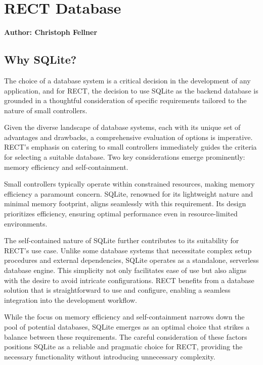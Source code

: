 \section{RECT Database}
\textbf{Author: Christoph Fellner}

\subsection{Why SQLite?}
The choice of a database system is a critical decision in the development of any application, and for RECT, the decision to use SQLite as the backend database 
is grounded in a thoughtful consideration of specific requirements tailored to the nature of small controllers.\newline

Given the diverse landscape of database systems, each with its unique set of advantages and drawbacks, a comprehensive evaluation of options is imperative. 
RECT's emphasis on catering to small controllers immediately guides the criteria for selecting a suitable database. Two key considerations emerge prominently: 
memory efficiency and self-containment.\newline

Small controllers typically operate within constrained resources, making memory efficiency a paramount concern. SQLite, renowned for its lightweight nature and 
minimal memory footprint, aligns seamlessly with this requirement. Its design prioritizes efficiency, ensuring optimal performance even in resource-limited 
environments.\newline

The self-contained nature of SQLite further contributes to its suitability for RECT's use case. Unlike some database systems that necessitate complex setup 
procedures and external dependencies, SQLite operates as a standalone, serverless database engine. This simplicity not only facilitates ease of use but also 
aligns with the desire to avoid intricate configurations. RECT benefits from a database solution that is straightforward to use and configure, enabling a 
seamless integration into the development workflow.\newline

While the focus on memory efficiency and self-containment narrows down the pool of potential databases, SQLite emerges as an optimal choice that strikes a 
balance between these requirements. The careful consideration of these factors positions SQLite as a reliable and pragmatic choice for RECT, providing the 
necessary functionality without introducing unnecessary complexity.\newline

